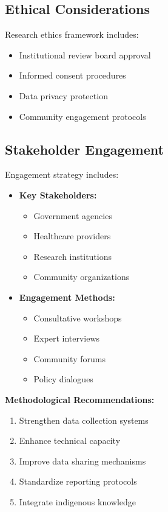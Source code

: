\subsection{Ethical Considerations}
Research ethics framework includes:

\begin{itemize}
    \item Institutional review board approval
    \item Informed consent procedures
    \item Data privacy protection
    \item Community engagement protocols
\end{itemize}

\subsection{Stakeholder Engagement}
Engagement strategy includes:

\begin{itemize}
    \item \textbf{Key Stakeholders:}
    \begin{itemize}
        \item Government agencies
        \item Healthcare providers
        \item Research institutions
        \item Community organizations
    \end{itemize}
    
    \item \textbf{Engagement Methods:}
    \begin{itemize}
        \item Consultative workshops
        \item Expert interviews
        \item Community forums
        \item Policy dialogues
    \end{itemize}
\end{itemize}

\begin{recommendation}
\textbf{Methodological Recommendations:}
\begin{enumerate}
    \item Strengthen data collection systems
    \item Enhance technical capacity
    \item Improve data sharing mechanisms
    \item Standardize reporting protocols
    \item Integrate indigenous knowledge
\end{enumerate}
\end{recommendation}
